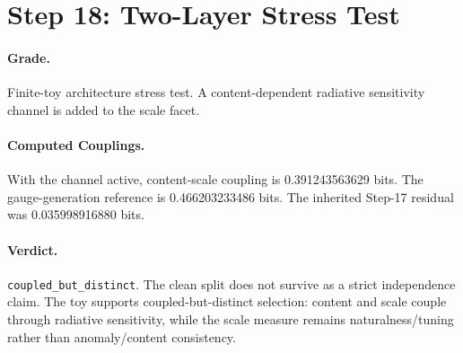 \section{Step 18: Two-Layer Stress Test}

\paragraph{Grade.}
Finite-toy architecture stress test. A content-dependent radiative sensitivity channel is added to the scale facet.

\paragraph{Computed Couplings.}
With the channel active, content-scale coupling is 0.391243563629 bits. The gauge-generation reference is 0.466203233486 bits. The inherited Step-17 residual was 0.035998916880 bits.

\paragraph{Verdict.}
\texttt{coupled_but_distinct}. The clean split does not survive as a strict independence claim. The toy supports coupled-but-distinct selection: content and scale couple through radiative sensitivity, while the scale measure remains naturalness/tuning rather than anomaly/content consistency.
